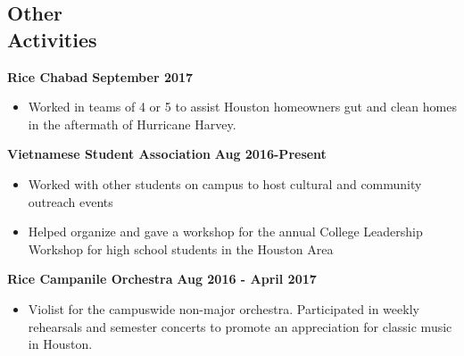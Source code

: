 \documentclass[margin,line]{resume}
\begin{document}
\begin{resume}
    \section{\mysidestyle Other\\ Activities}
    \textbf{Rice Chabad} \hfill \textbf{September 2017}
    \begin{itemize}
    \item Worked in teams of 4 or 5 to assist Houston homeowners gut and clean homes in the aftermath of Hurricane Harvey.
    \end{itemize}
    \vspace{-3mm}
    \textbf{Vietnamese Student Association} \hfill \textbf{Aug 2016-Present}
    \begin{itemize}
    \item Worked with other students on campus to host cultural and community outreach events
    \item Helped organize and gave a workshop for the annual College Leadership Workshop for high school students in the Houston Area
    \end{itemize}
    \vspace{-3mm}
    \textbf{Rice Campanile Orchestra} \hfill \textbf{Aug 2016 - April 2017}
    \begin{itemize}
    \item Violist for the campuswide non-major orchestra.
    Participated in weekly rehearsals and semester concerts to promote an appreciation for classic music in Houston.
    \end{itemize}




\end{resume}
\end{document}

